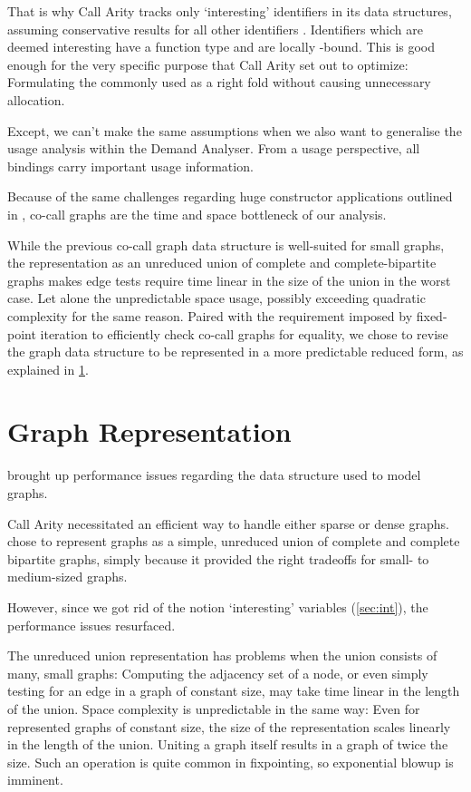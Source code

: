 That is why Call Arity tracks only `interesting' identifiers in its data structures, assuming conservative results for all other identifiers \parencite{callarity}. 
Identifiers which are deemed interesting have a function type and are locally -bound.
This is good enough for the very specific purpose that Call Arity set out to optimize: 
Formulating the commonly used  as a right fold without causing unnecessary allocation.

Except, we can't make the same assumptions when we also want to generalise the usage analysis within the Demand Analyser.
From a usage perspective, all bindings carry important usage information. 

Because of the same challenges regarding huge constructor applications outlined in \textcite[section~3.4.1]{callarity}, co-call graphs are the time and space bottleneck of our analysis.

While the previous co-call graph data structure is well-suited for small graphs, the representation as an unreduced union of complete and complete-bipartite graphs makes edge tests require time linear in the size of the union in the worst case. 
Let alone the unpredictable space usage, possibly exceeding quadratic complexity for the same reason.
Paired with the requirement imposed by fixed-point iteration to efficiently check co-call graphs for equality, we chose to revise the graph data structure to be represented in a more predictable reduced form, as explained in \cref{sec:graphrep}.

\section{Graph Representation}\label{sec:graphrep}

 brought up performance issues regarding the data structure used to model graphs.

Call Arity necessitated an efficient way to handle either sparse or dense graphs.
\textcite{callarity} chose to represent graphs as a simple, unreduced union of complete and complete bipartite graphs, simply because it provided the right tradeoffs for small- to medium-sized graphs.

However, since we got rid of the notion `interesting' variables (\cf \cref{sec:int}), the performance issues resurfaced.

The unreduced union representation has problems when the union consists of many, small graphs:
Computing the adjacency set of a node, or even simply testing for an edge in a graph of constant size, may take time linear in the length of the union.
Space complexity is unpredictable in the same way:
Even for represented graphs of constant size, the size of the representation scales linearly in the length of the union.
Uniting a graph itself results in a graph of twice the size.
Such an operation is quite common in fixpointing, so exponential blowup is imminent.

